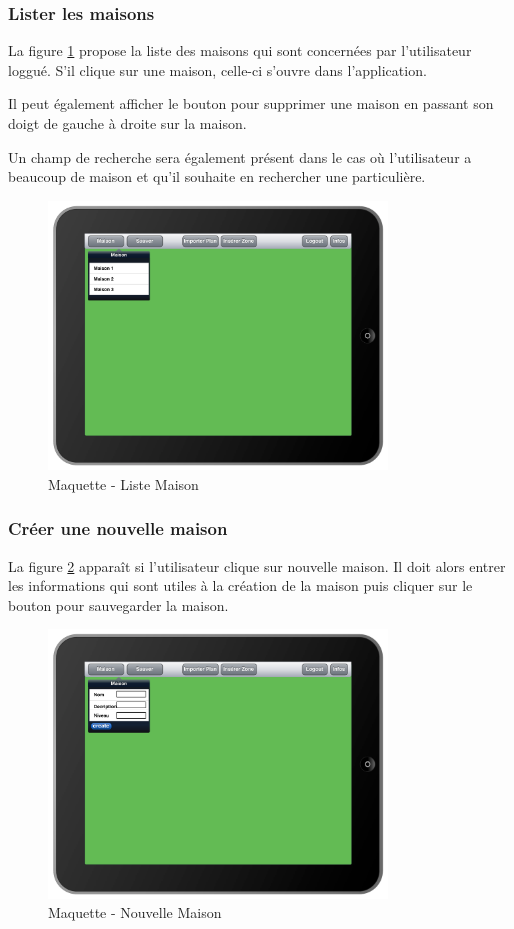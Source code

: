 \subsubsection{Lister les maisons}
La figure \ref{gra:maq02} propose la liste des maisons qui sont concernées par l'utilisateur loggué. S'il clique sur une maison, celle-ci s'ouvre dans l'application.

\medskip

Il peut également afficher le bouton pour supprimer une maison en passant son doigt de gauche à droite sur la maison.

\medskip

Un champ de recherche sera également présent dans le cas où l'utilisateur a beaucoup de maison et qu'il souhaite en rechercher une particulière.

\begin{figure}[H]
      \centering
      \includegraphics[width=9cm]{00_media/04_Maquette_02.pdf}
      \caption{Maquette - Liste Maison}
      \label{gra:maq02}
\end{figure}
\subsubsection{Créer une nouvelle maison}
La figure \ref{gra:maq03} apparaît si l'utilisateur clique sur nouvelle maison. Il doit alors entrer les informations qui sont utiles à la création de la maison puis cliquer sur le bouton pour sauvegarder la maison.
\begin{figure}[H]
      \centering
      \includegraphics[width=9cm]{00_media/04_Maquette_03.pdf}
      \caption{Maquette - Nouvelle Maison}
      \label{gra:maq03}
\end{figure}
